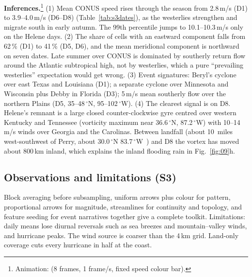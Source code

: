 \textbf{Inferences.}\footnote{Animation:  (8 frames, 1 frame/s, fixed speed colour bar).}
(1) Mean CONUS speed rises through the season from 2.8\,m/s (D1) to 3.9--4.0\,m/s (D6--D8) (Table~\ref{tab:s3dates}), as
the westerlies strengthen and migrate south in early autumn. The 99th percentile jumps to 10.1--10.3\,m/s only on the
Helene days.
(2) The share of cells with an eastward component falls from 62\,\% (D1) to 41\,\% (D5, D6), and the mean meridional
component is northward on seven dates. Late summer over CONUS is dominated by southerly return flow around the
Atlantic subtropical high, not by westerlies, which a pure ``prevailing westerlies'' expectation would get wrong.
(3) Event signatures: Beryl's cyclone over east Texas and Louisiana (D1); a separate cyclone over Minnesota and Wisconsin plus
Debby in Florida (D3); 5\,m/s mean southerly flow over the northern Plains (D5, 35--48\,$^\circ$N, 95--102\,$^\circ$W).
(4) The clearest signal is on D8. Helene's remnant is a large closed counter-clockwise gyre centred over western Kentucky and
Tennessee (vorticity maximum near 36.6\,$^\circ$N, 87.2\,$^\circ$W) with 10--14\,m/s winds over Georgia and the Carolinas.
Between landfall (about 10~miles west-southwest of Perry, about 30.0\,$^\circ$N 83.7\,$^\circ$W~\cite{nhc_tcr}) and D8 the vortex has moved about 800\,km inland, which explains the inland flooding rain in Fig.~\ref{fig:09}h.

\subsection{Observations and limitations (S3)}
Block averaging before subsampling, uniform arrows plus colour for pattern, proportional arrows for magnitude, streamlines
for continuity and topology, and feature seeding for event narratives together give a complete toolkit. Limitations: daily
means lose diurnal reversals such as sea breezes and mountain--valley winds, and hurricane peaks. The wind source is coarser
than the 4\,km grid. Land-only coverage cuts every hurricane in half at the coast.
